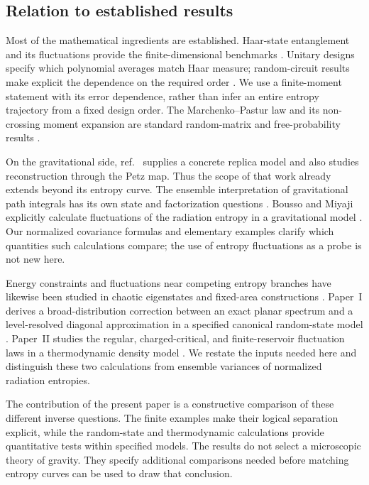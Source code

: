 \documentclass[11pt,letterpaper]{article}
\theoremstyle{plain}
\theoremstyle{definition}
\theoremstyle{remark}
\begin{document}
\subsection{Relation to established results}

Most of the mathematical ingredients are established. Haar-state
entanglement and its fluctuations provide the finite-dimensional
benchmarks \cite{lubkin1978,page1993,bianchidona2019,giraud2007}.
Unitary designs specify which polynomial averages match Haar measure;
random-circuit results make explicit the dependence on the required
order \cite{brandaoetal2016}. We use a finite-moment statement with its
error dependence, rather than infer an entire entropy trajectory from
a fixed design order. The Marchenko--Pastur law and its non-crossing
moment expansion are standard random-matrix and free-probability
results \cite{nicaspeicher2006}.

On the gravitational side, ref.~\cite{pssyetal2022} supplies a concrete
replica model and also studies reconstruction through the Petz map.
Thus the scope of that work already extends beyond its entropy curve.
The ensemble interpretation of gravitational path integrals has its own
state and factorization questions \cite{saadetal2019,marolfmaxfield2020}.
Bousso and Miyaji explicitly calculate fluctuations of the radiation
entropy in a gravitational model \cite{boussomiyaji2024}. Our normalized
covariance formulas and elementary examples clarify which quantities
such calculations compare; the use of entropy fluctuations as a
probe is not new here.

Energy constraints and fluctuations near competing entropy branches
have likewise been studied in chaotic eigenstates and fixed-area
constructions \cite{murthysrednicki2019,marolfwangwang2020}.
Paper~I derives a broad-distribution correction between an exact planar
spectrum and a level-resolved diagonal approximation in a specified
canonical random-state model \cite{wuebben2026a}. Paper~II studies the
regular, charged-critical, and finite-reservoir fluctuation laws in a
thermodynamic density model \cite{wuebben2026b}. We restate the inputs
needed here and distinguish these two calculations from ensemble
variances of normalized radiation entropies.

The contribution of the present paper is a constructive comparison of
these different inverse questions. The finite examples make their
logical separation explicit, while the random-state and thermodynamic
calculations provide quantitative tests within specified models. The
results do not select a microscopic theory of gravity. They specify
additional comparisons needed before matching entropy curves can be
used to draw that conclusion.
\end{document}

